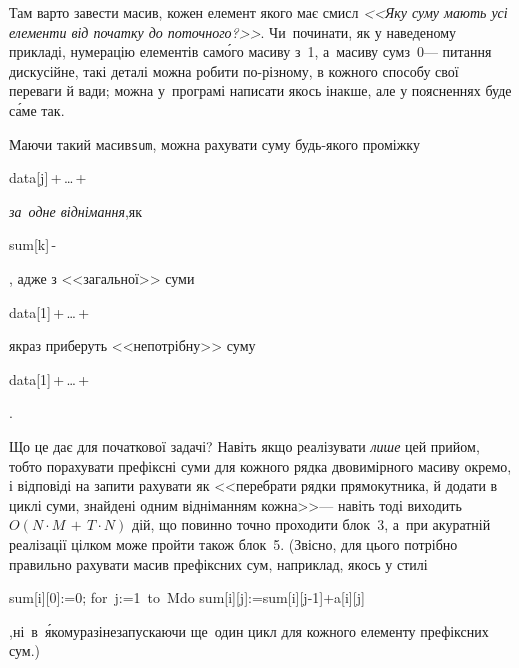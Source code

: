 Там варто завести масив, кожен елемент якого має смисл \textsl{<<Яку суму мають усі елементи від початку до поточного?>>}. Чи~починати, як у наведеному прикладі, нумерацію елементів сам\'{о}го масиву з~1, а~масиву сум\nolinebreak[3] з~0\nolinebreak[3] --- питання дискусійне, такі деталі можна робити по-різному, в кожного способу свої 
переваги й вади; можна 
у~програмі написати якось інакше, але у поясненнях буде с\'{а}ме так.

Маючи такий масив\nolinebreak[2] \texttt{sum}, можна рахувати суму будь-якого проміжку 
\begin{ttfamily}{data[j]$\,$+$\,$}\nolinebreak[3]\mbox{\dots$\,$+$\,$}\end{ttfamily} \emph{за~одне віднімання},\linebreak[2] як\nolinebreak[2] \begin{ttfamily}{sum[k]$\,$-$\,$}\end{ttfamily}, адже з <<загальної>> суми 
\begin{ttfamily}{data[1]$\,$+$\,$}\nolinebreak[3]\mbox{\dots$\,$+$\,$}\end{ttfamily}
якраз приберуть <<непотрібну>> суму 
\begin{ttfamily}{data[1]$\,$+$\,$}\nolinebreak[3]\mbox{\dots$\,$+$\,$}\end{ttfamily}.

Що це дає для початкової задачі? 
Навіть якщо реалізувати \emph{лише} цей прийом, тобто порахувати префіксні суми для кожного рядка двовимірного масиву окремо, і відповіді на запити рахувати як <<перебрати рядки прямокутника, й додати в циклі суми, знайдені одним відніманням кожна>>\nolinebreak[3] --- навіть тоді виходить $O(N{\cdot}M\,{+}\,T{\cdot}N)$ дій, що повинно точно проходити блок~3, а~при акуратній реалізації цілком може пройти також блок~5. (Звісно, для цього потрібно правильно рахувати масив префіксних сум, наприклад, якось у стилі \begin{ttfamily}\mbox{sum[i][0]:=0;} \mbox{for j:=1 to M}\nolinebreak[2] do \mbox{sum[i][j]:=}\nolinebreak[2]\mbox{sum[i][j-1]+}\nolinebreak[2]a[i][j]\end{ttfamily},\linebreak[2] ні~в~\'{я}ко\-му\nolinebreak[2] разі\nolinebreak[2] не\nolinebreak[3] запускаючи ще~один цикл для кожного елементу префіксних сум.)

